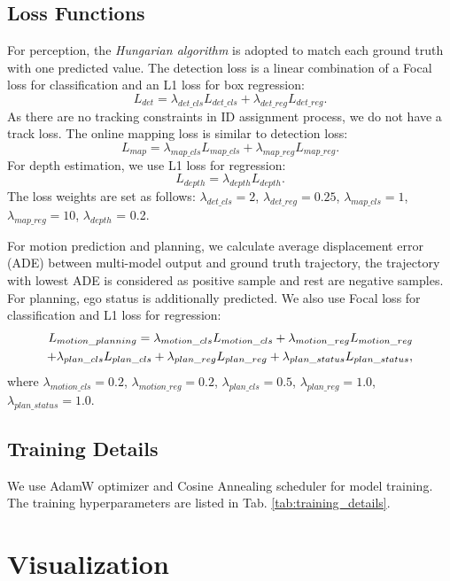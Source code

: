\subsection{Loss Functions} \label{app:loss_func}
For perception, the \textit{Hungarian algorithm} is adopted to match each ground truth with one predicted value. The detection loss is a linear combination of a Focal loss\cite{focalloss} for classification and an L1 loss for box regression:
\begin{equation}
L_{det} = \lambda_{det\_cls}L_{det\_cls} + \lambda_{det\_reg}L_{det\_reg}.
\end{equation}
As there are no tracking constraints in ID assignment process, we do not have a track loss. The online mapping loss is similar to detection loss: 
\begin{equation}
L_{map} = \lambda_{map\_cls}L_{map\_cls} + \lambda_{map\_reg}L_{map\_reg}.
\end{equation}
For depth estimation, we use L1 loss for regression:
\begin{equation}
L_{depth} = \lambda_{depth}L_{depth}.
\end{equation}
The loss weights are set as follows: $\lambda_{det\_cls}=2$, $\lambda_{det\_reg}=0.25$, $\lambda_{map\_cls}=1$, $\lambda_{map\_reg}=10$, $\lambda_{depth}$ = 0.2.

For motion prediction and planning, we calculate average displacement error (ADE) between multi-model output and ground truth trajectory, the trajectory with lowest ADE is considered as positive sample and rest are negative samples. For planning, ego status is additionally predicted. We also use Focal loss for classification and L1 loss for regression: 
\begin{align}
L_{motion\_planning} = \lambda_{motion\_cls}L_{motion\_cls} + \lambda_{motion\_reg}L_{motion\_reg} \notag \\
+ \lambda_{plan\_cls}L_{plan\_cls} + \lambda_{plan\_reg}L_{plan\_reg} + \lambda_{plan\_status}L_{plan\_status},
\end{align}
where $\lambda_{motion\_cls}=0.2$, $\lambda_{motion\_reg}=0.2$, $\lambda_{plan\_cls}=0.5$, $\lambda_{plan\_reg}=1.0$, $\lambda_{plan\_status}=1.0$.

\subsection{Training Details} \label{app:training}
We use AdamW optimizer\cite{adamw} and Cosine Annealing\cite{cosine} scheduler for model training. The training hyperparameters are listed in Tab. \ref{tab:training_details}.



\section{Visualization} \label{app:vis}

